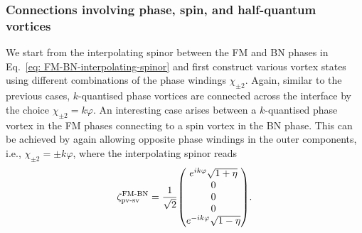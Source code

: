 \subsubsection{Connections involving phase, spin, and half-quantum vortices}
We start from the interpolating spinor between the FM and BN phases in
Eq.~\eqref{eq: FM-BN-interpolating-spinor} and first construct various vortex
states using different combinations of the phase windings \(\chi_{\pm 2}\).
Again, similar to the previous cases, \(k\)-quantised phase vortices are
connected across the interface by the choice \(\chi_{\pm 2} = k\varphi \).
An interesting case arises between a \(k\)-quantised phase vortex in the FM
phases connecting to a spin vortex in the BN phase.
This can be achieved by again allowing opposite phase windings in the outer
components, i.e., \(\chi_{\pm 2} = \pm k\varphi \), where the interpolating
spinor reads
\begin{align}\label{eq: FM-BN-pv-sv}
    \zeta^\text{FM-BN}_\text{pv-sv} = \frac{1}{\sqrt{2}}\mqty(
    e^{ik\varphi} \sqrt{1 + \eta} \\
    0 \\
    0 \\
    0 \\
    e^{-ik\varphi} \sqrt{1 - \eta}).
\end{align}

